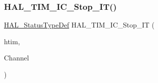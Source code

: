 \subsubsection{\texorpdfstring{H\+A\+L\+\_\+\+T\+I\+M\+\_\+\+I\+C\+\_\+\+Stop\+\_\+\+I\+T()}{HAL\_TIM\_IC\_Stop\_IT()}}
{\footnotesize\ttfamily \hyperlink{stm32f4xx__hal__def_8h_a63c0679d1cb8b8c684fbb0632743478f}{H\+A\+L\+\_\+\+Status\+Type\+Def} H\+A\+L\+\_\+\+T\+I\+M\+\_\+\+I\+C\+\_\+\+Stop\+\_\+\+IT (\begin{DoxyParamCaption}\item[{\hyperlink{struct_t_i_m___handle_type_def}{T\+I\+M\+\_\+\+Handle\+Type\+Def} $\ast$}]{htim,  }\item[{uint32\+\_\+t}]{Channel }\end{DoxyParamCaption})}

